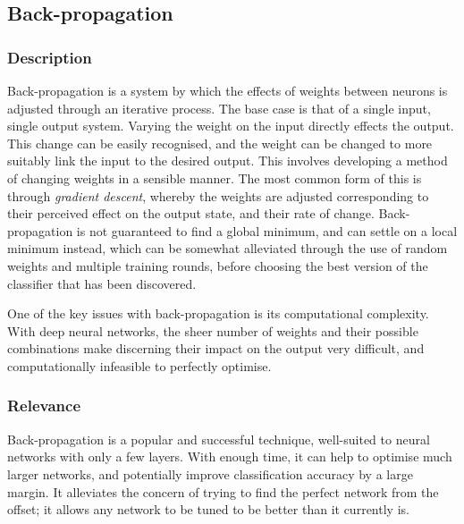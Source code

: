 \subsection{Back-propagation}
\subsubsection{Description}
Back-propagation is a system by which the effects of weights between neurons is adjusted through an iterative process. The base case is that of a single input, single output system. 
Varying the weight on the input directly effects the output. This change can be easily recognised, and the weight can be changed to more suitably link the input to the desired output. This involves developing a method of changing weights in a sensible manner. The most common form of this is through \textit{gradient descent}, whereby the weights are adjusted corresponding to their perceived effect on the output state, and their rate of change. Back-propagation is not guaranteed to find a global minimum, and can settle on a local minimum instead, which can be somewhat alleviated through the use of random weights and multiple training rounds, before choosing the best version of the classifier that has been discovered. 

One of the key issues with back-propagation is its computational complexity. With deep neural networks, the sheer number of weights and their possible combinations make discerning their impact on the output very difficult, and computationally infeasible to perfectly optimise.

\subsubsection{Relevance}
Back-propagation is a popular and successful technique, well-suited to neural networks with only a few layers. With enough time, it can help to optimise much larger networks, and potentially improve classification accuracy by a large margin. It alleviates the concern of trying to find the perfect network from the offset; it allows any network to be tuned to be better than it currently is.